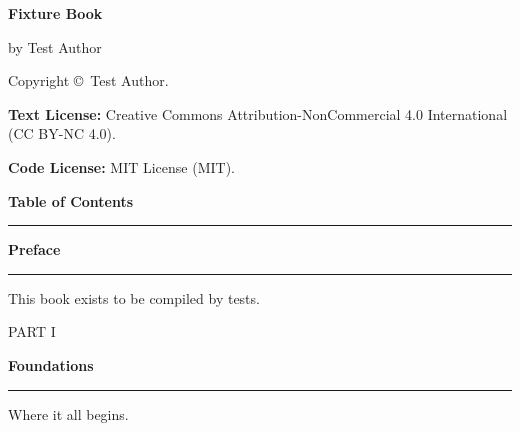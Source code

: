 \documentclass[10pt,twoside,openany]{book}
\newcommand{\currentparttitle}{Book}
\newcommand{\currentchaptitle}{Introduction}
\begin{document}
\thispagestyle{empty}
\vspace*{0.4in}
{\sansbold\bfseries\fontsize{11pt}{14pt}\selectfont Fixture Book\par}
\noindent by Test Author\par
\vspace{8pt}
\noindent Copyright \copyright\ Test Author.\par
\vspace{8pt}
\noindent\textbf{Text License:} Creative Commons Attribution-NonCommercial 4.0 International (CC BY-NC 4.0).\par
\noindent\textbf{Code License:} MIT License (MIT).\par
\vspace{8pt}

\clearpage


\renewcommand{\currentparttitle}{Table of Contents}
\renewcommand{\currentchaptitle}{Table of Contents}
\setcounter{tocdepth}{0}
{\sansbold\bfseries\fontsize{22pt}{26pt}\selectfont\textcolor{brandcrimson}{Table of Contents}\par}
\vspace{6pt}
\noindent\textcolor{brandcrimson}{\rule{\textwidth}{0.8pt}}\par
\vspace{6pt}
\makeatletter
{}
\makeatother
\clearpage


\clearpage
{}
\renewcommand{\currentparttitle}{Front Matter}
\renewcommand{\currentchaptitle}{Preface}
{\sansbold\bfseries\fontsize{21pt}{25pt}\selectfont\textcolor{bodyblack}{Preface}\par}
\vspace{4pt}
\noindent\textcolor{brandcrimson}{\rule{\textwidth}{0.6pt}}\par
\vspace{8pt}
This book exists to be compiled by tests.


\mainmatter
\renewcommand{\currentparttitle}{Fixture Book}

\clearpage
\thispagestyle{empty}
\renewcommand{\currentparttitle}{Part I: Foundations}
\vspace*{1.1in}
{\sanscond\fontsize{14pt}{18pt}\selectfont\textcolor{brandcrimson}{PART I}\par}
\vspace{6pt}
{\sansbold\bfseries\fontsize{24pt}{29pt}\selectfont\textcolor{bodyblack}{Foundations}\par}
\vspace{8pt}
\noindent\textcolor{brandcrimson}{\rule{\textwidth}{0.9pt}}\par
\vspace{14pt}
{\fontsize{10.8pt}{15pt}\selectfont\textcolor{diaggray}{Where it all begins.}\par}
\clearpage
\end{document}
